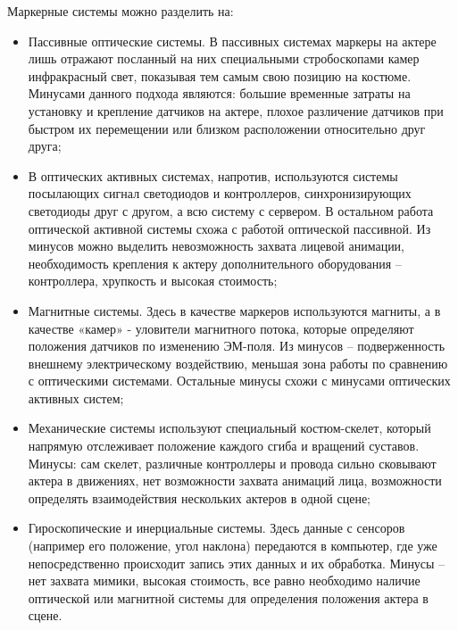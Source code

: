 
Маркерные системы можно разделить на:
\begin{itemize}
	\item Пассивные оптические системы. В пассивных системах маркеры на актере лишь отражают посланный на них специальными стробоскопами камер инфракрасный свет, показывая тем самым свою позицию на костюме. Минусами данного подхода являются: большие временные затраты на установку и крепление датчиков на актере, плохое различение датчиков при быстром их перемещении или близком расположении относительно друг друга;
	\item В оптических активных системах, напротив, используются системы посылающих сигнал светодиодов и контроллеров, синхронизирующих светодиоды друг с другом, а всю систему с сервером. В остальном работа оптической активной системы схожа с работой оптической пассивной. Из минусов можно выделить невозможность захвата лицевой анимации, необходимость крепления к актеру дополнительного оборудования – контроллера, хрупкость и высокая стоимость;
	\item Магнитные системы. Здесь в качестве маркеров используются магниты, а в качестве «камер» - уловители магнитного потока, которые определяют положения датчиков по изменению ЭМ-поля. Из минусов – подверженность внешнему электрическому воздействию, меньшая зона работы по сравнению с оптическими системами. Остальные минусы схожи с минусами оптических активных систем;
	\item Механические системы используют специальный костюм-скелет, который напрямую отслеживает положение каждого сгиба и вращений суставов. Минусы: сам скелет, различные контроллеры и провода сильно сковывают актера в движениях, нет возможности захвата анимаций лица, возможности определять взаимодействия нескольких актеров в одной сцене;
	\item Гироскопические и инерциальные системы. Здесь данные с сенсоров (например его положение, угол наклона) передаются в компьютер, где уже непосредственно происходит запись этих данных и их обработка. Минусы – нет захвата мимики, высокая стоимость, все равно необходимо наличие оптической или магнитной системы для определения положения актера в сцене.
\end{itemize}


